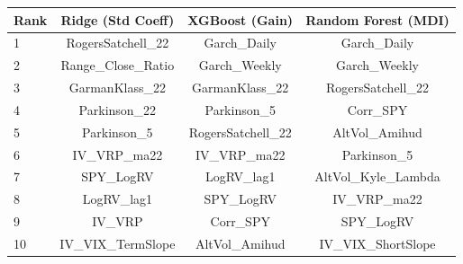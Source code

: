 \begin{tabular}{lccc}
\toprule
Rank & Ridge (Std Coeff) & XGBoost (Gain) & Random Forest (MDI) \\
\midrule
1 & RogersSatchell_22 & Garch_Daily & Garch_Daily \\
2 & Range_Close_Ratio & Garch_Weekly & Garch_Weekly \\
3 & GarmanKlass_22 & GarmanKlass_22 & RogersSatchell_22 \\
4 & Parkinson_22 & Parkinson_5 & Corr_SPY \\
5 & Parkinson_5 & RogersSatchell_22 & AltVol_Amihud \\
6 & IV_VRP_ma22 & IV_VRP_ma22 & Parkinson_5 \\
7 & SPY_LogRV & LogRV_lag1 & AltVol_Kyle_Lambda \\
8 & LogRV_lag1 & SPY_LogRV & IV_VRP_ma22 \\
9 & IV_VRP & Corr_SPY & SPY_LogRV \\
10 & IV_VIX_TermSlope & AltVol_Amihud & IV_VIX_ShortSlope \\
\bottomrule
\end{tabular}
